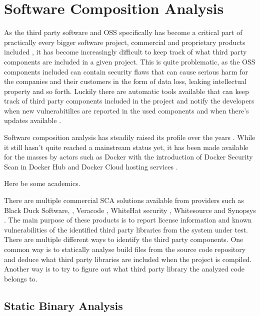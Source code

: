 
\section{Software Composition Analysis}

As the third party software and OSS specifically has become a critical part of practically every
bigger software project, commercial and proprietary products included \cite{blah}, it has become
increasingly difficult to keep track of what third party components are included in a given
project. This is quite problematic, as the OSS components included can contain security flaws that
can cause serious harm for the companies and their customers in the form of data loss, leaking
intellectual property and so forth. Luckily there are automatic tools available that can keep
track of third party components included in the project and notify the developers when new
vulnerabitilies are reported in the used components and when there's updates available
\cite{pittenger2016know}.

Software composition analysis has steadily raised its profile over the years \cite{blah}. While it
still hasn't quite reached a mainstream status yet, it has been made available for the masses by
actors such as Docker with the introduction of Docker Security Scan in Docker Hub and Docker Cloud
hosting services \cite{dockerscan}.

Here be some academics.

There are multiple commercial SCA solutions available from providers such as Black Duck Software,
\cite{blackduckhub}, Veracode \cite{veracodesca}, WhiteHat security \cite{whitehatsentinel},
Whitesource \cite{whitesourceosi} and Synopsys \cite{synopsysprotecode}. The main purpose of these
products is to report license information and known vulnerabilities of the identified third party
libraries from the system under test. There are multiple different ways to identify the third party
components. One common way is to statically analyse build files from the source code repository and
deduce what third party libraries are included when the project is compiled. Another way is to try
to figure out what third party library the analyzed code belongs to.

\subsection{Static Binary Analysis}

